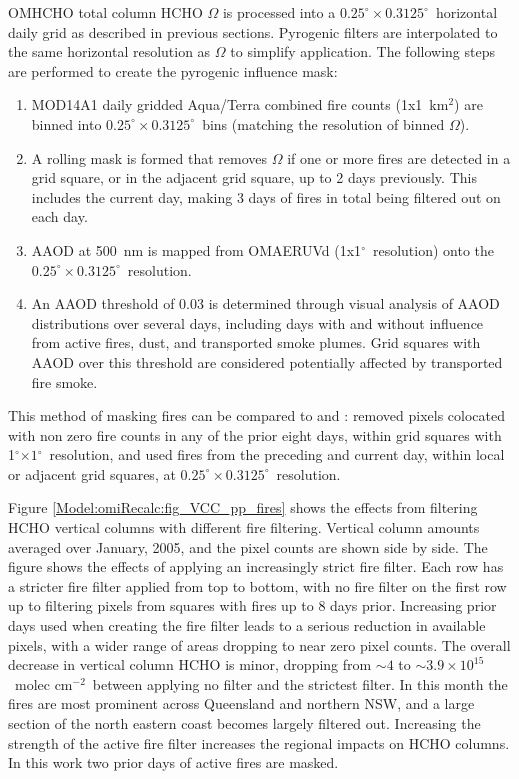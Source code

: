 \documentclass[acp, manuscript]{copernicus}
\newcommand{\textcite}{\citet}
\newcommand{\degr}{$^{\circ}$}
\newcommand{\moleccm}{~molec cm$^{-2}$}
\newcommand{\highhr}{$0.25^{\circ} \times 0.3125^{\circ}$}
\begin{document}
    OMHCHO total column HCHO $\Omega$ is processed into a \highhr ~horizontal daily grid as described in previous sections.
    Pyrogenic filters are interpolated to the same horizontal resolution as $\Omega$ to simplify application. 
    The following steps are performed to create the pyrogenic influence mask:
    \begin{enumerate}
      \item MOD14A1 daily gridded Aqua/Terra combined fire counts (1x1~km$^2$) are binned into \highhr ~bins (matching the resolution of binned $\Omega$).
      \item A rolling mask is formed that removes $\Omega$ if one or more fires are detected in a grid square, or in the adjacent grid square, up to 2 days previously.
      This includes the current day, making 3 days of fires in total being filtered out on each day.
      \item AAOD at 500~nm is mapped from OMAERUVd (1x1\degr ~resolution) onto the \highhr ~resolution.
      \item An AAOD threshold of 0.03 is determined through visual analysis of AAOD distributions over several days, including days with and without influence from active fires, dust, and transported smoke plumes. 
      Grid squares with AAOD over this threshold are considered potentially affected by transported fire smoke.
    \end{enumerate}
    This method of masking fires can be compared to \textcite{Marais2012} and \textcite{Barkley2013}:
    \textcite{Marais2012} removed pixels colocated with non zero fire counts in any of the prior eight days, within grid squares with 1\degr$\times 1$\degr ~resolution, and \textcite{Barkley2013} used fires from the preceding and current day, within local or adjacent grid squares, at \highhr ~resolution.
    
    
    Figure \ref{Model:omiRecalc:fig_VCC_pp_fires} shows the effects from filtering HCHO vertical columns with different fire filtering.
    Vertical column amounts averaged over January, 2005, and the pixel counts are shown side by side.
    The figure shows the effects of applying an increasingly strict fire filter.
    Each row has a stricter fire filter applied from top to bottom, with no fire filter on the first row up to filtering pixels from squares with fires up to 8 days prior.
    Increasing prior days used when creating the fire filter leads to a serious reduction in available pixels, with a wider range of areas dropping to near zero pixel counts.
    The overall decrease in vertical column HCHO is minor, dropping from $\sim{4}$ to $\sim{3.9} \times 10^{15}$  \moleccm ~between applying no filter and the strictest filter.
    In this month the fires are most prominent across Queensland and northern NSW, and a large section of the north eastern coast becomes largely filtered out.
    Increasing the strength of the active fire filter increases the regional impacts on HCHO columns.
    In this work two prior days of active fires are masked.
    
\end{document}
